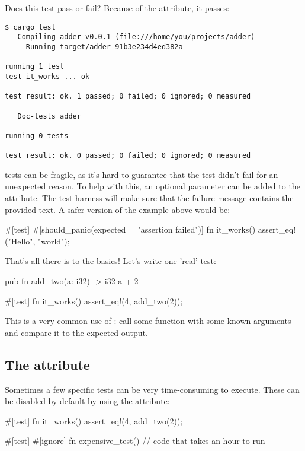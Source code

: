 Does this test pass or fail? Because of the  attribute, it passes:

\begin{verbatim}
$ cargo test
   Compiling adder v0.0.1 (file:///home/you/projects/adder)
     Running target/adder-91b3e234d4ed382a

running 1 test
test it_works ... ok

test result: ok. 1 passed; 0 failed; 0 ignored; 0 measured

   Doc-tests adder

running 0 tests

test result: ok. 0 passed; 0 failed; 0 ignored; 0 measured
\end{verbatim}

 tests can be fragile, as it's hard to guarantee that the test didn't fail for an unexpected reason. To help 
with this, an optional  parameter can be added to the  attribute. The test harness will make 
sure that the failure message contains the provided text. A safer version of the example above would be:

\begin{rustc}
#[test]
#[should_panic(expected = "assertion failed")]
fn it_works() {
    assert_eq!("Hello", "world");
}
\end{rustc}

That's all there is to the basics! Let's write one 'real' test:

\begin{rustc}
pub fn add_two(a: i32) -> i32 {
    a + 2
}

#[test]
fn it_works() {
    assert_eq!(4, add_two(2));
}
\end{rustc}

This is a very common use of : call some function with some known arguments and compare it to the expected output.

\subsection*{The  attribute}

Sometimes a few specific tests can be very time-consuming to execute. These can be disabled by default by using the  attribute:

\begin{rustc}
#[test]
fn it_works() {
    assert_eq!(4, add_two(2));
}

#[test]
#[ignore]
fn expensive_test() {
    // code that takes an hour to run
}
\end{rustc}

